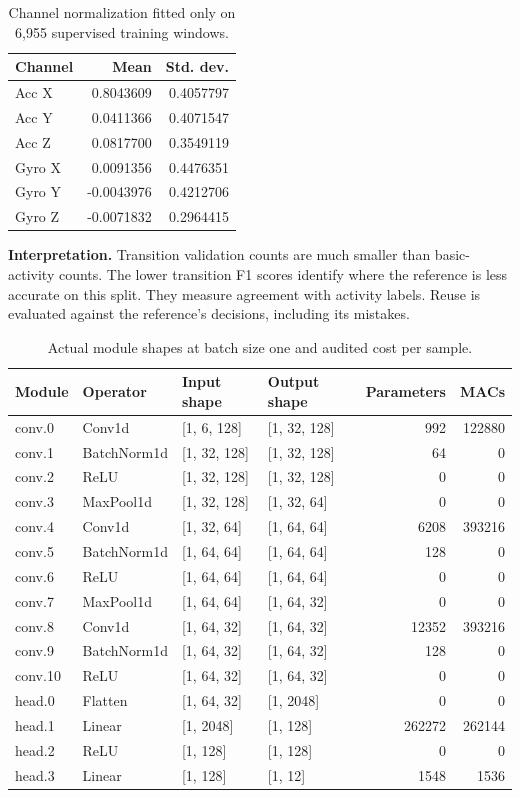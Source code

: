 \begin{table}[H]
\caption{Channel normalization fitted only on 6,955 supervised training windows.}
\centering\small
\begin{tabularx}{\textwidth}{@{}Yrr@{}}\toprule
Channel & Mean & Std. dev.\\
\midrule
Acc X & 0.8043609 & 0.4057797\\
Acc Y & 0.0411366 & 0.4071547\\
Acc Z & 0.0817700 & 0.3549119\\
Gyro X & 0.0091356 & 0.4476351\\
Gyro Y & -0.0043976 & 0.4212706\\
Gyro Z & -0.0071832 & 0.2964415\\
\bottomrule\end{tabularx}
\end{table}
\textbf{Interpretation.} Transition validation counts are much smaller than basic-activity counts. The lower transition F1 scores identify where the reference is less accurate on this split. They measure agreement with activity labels. Reuse is evaluated against the reference's decisions, including its mistakes.
\begin{table}[H]
\caption{Actual module shapes at batch size one and audited cost per sample.}
\centering\small
\begin{tabularx}{\textwidth}{@{}lYYYrr@{}}\toprule
Module & Operator & Input shape & Output shape & Parameters & MACs\\
\midrule
conv.0 & Conv1d & [1, 6, 128] & [1, 32, 128] & 992 & 122880\\
conv.1 & BatchNorm1d & [1, 32, 128] & [1, 32, 128] & 64 & 0\\
conv.2 & ReLU & [1, 32, 128] & [1, 32, 128] & 0 & 0\\
conv.3 & MaxPool1d & [1, 32, 128] & [1, 32, 64] & 0 & 0\\
conv.4 & Conv1d & [1, 32, 64] & [1, 64, 64] & 6208 & 393216\\
conv.5 & BatchNorm1d & [1, 64, 64] & [1, 64, 64] & 128 & 0\\
conv.6 & ReLU & [1, 64, 64] & [1, 64, 64] & 0 & 0\\
conv.7 & MaxPool1d & [1, 64, 64] & [1, 64, 32] & 0 & 0\\
conv.8 & Conv1d & [1, 64, 32] & [1, 64, 32] & 12352 & 393216\\
conv.9 & BatchNorm1d & [1, 64, 32] & [1, 64, 32] & 128 & 0\\
conv.10 & ReLU & [1, 64, 32] & [1, 64, 32] & 0 & 0\\
head.0 & Flatten & [1, 64, 32] & [1, 2048] & 0 & 0\\
head.1 & Linear & [1, 2048] & [1, 128] & 262272 & 262144\\
head.2 & ReLU & [1, 128] & [1, 128] & 0 & 0\\
head.3 & Linear & [1, 128] & [1, 12] & 1548 & 1536\\
\bottomrule\end{tabularx}
\end{table}
